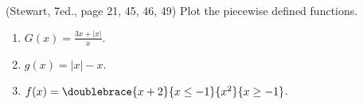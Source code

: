 (Stewart, 7ed., page 21, 45, 46, 49)
Plot the piecewise defined functions.
\begin{multicols}{2}
\begin{enumerate}
\item $G(x)=\frac{3x+|x|}x$.
\item $g(x)=|x|-x$.
\item $f(x)=\doublebrace{x+2}{x\leq -1}{x^2}{x\geq -1}$.
\end{enumerate}
\end{multicols}
